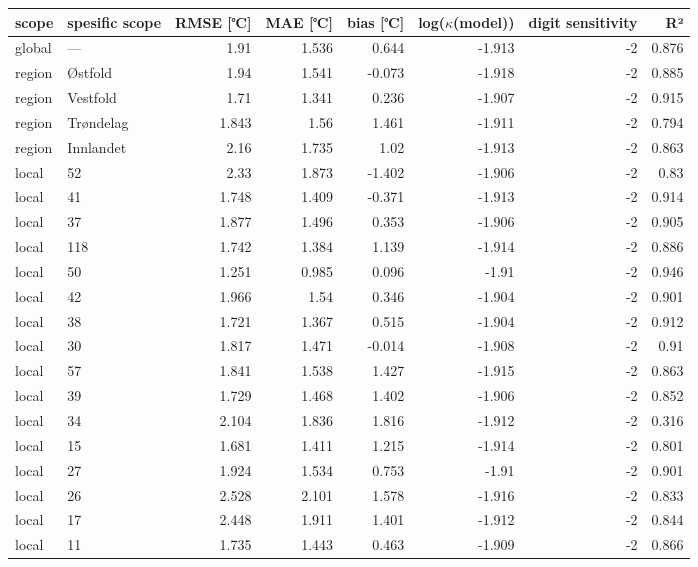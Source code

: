 \begin{tabular}{llrrrrrr}
\hline
 scope   & spesific
scope           &       RMSE
[℃] &   MAE [℃] &        bias
[℃] &   log($\kappa$(model)) &    digit
sensitivity &    R² \\
\hline
 global  & ---       & 1.91  &     1.536 &  0.644 &                 -1.913 & -2 & 0.876 \\
 region  & Østfold   & 1.94  &     1.541 & -0.073 &                 -1.918 & -2 & 0.885 \\
 region  & Vestfold  & 1.71  &     1.341 &  0.236 &                 -1.907 & -2 & 0.915 \\
 region  & Trøndelag & 1.843 &     1.56  &  1.461 &                 -1.911 & -2 & 0.794 \\
 region  & Innlandet & 2.16  &     1.735 &  1.02  &                 -1.913 & -2 & 0.863 \\
 local   & 52        & 2.33  &     1.873 & -1.402 &                 -1.906 & -2 & 0.83  \\
 local   & 41        & 1.748 &     1.409 & -0.371 &                 -1.913 & -2 & 0.914 \\
 local   & 37        & 1.877 &     1.496 &  0.353 &                 -1.906 & -2 & 0.905 \\
 local   & 118       & 1.742 &     1.384 &  1.139 &                 -1.914 & -2 & 0.886 \\
 local   & 50        & 1.251 &     0.985 &  0.096 &                 -1.91  & -2 & 0.946 \\
 local   & 42        & 1.966 &     1.54  &  0.346 &                 -1.904 & -2 & 0.901 \\
 local   & 38        & 1.721 &     1.367 &  0.515 &                 -1.904 & -2 & 0.912 \\
 local   & 30        & 1.817 &     1.471 & -0.014 &                 -1.908 & -2 & 0.91  \\
 local   & 57        & 1.841 &     1.538 &  1.427 &                 -1.915 & -2 & 0.863 \\
 local   & 39        & 1.729 &     1.468 &  1.402 &                 -1.906 & -2 & 0.852 \\
 local   & 34        & 2.104 &     1.836 &  1.816 &                 -1.912 & -2 & 0.316 \\
 local   & 15        & 1.681 &     1.411 &  1.215 &                 -1.914 & -2 & 0.801 \\
 local   & 27        & 1.924 &     1.534 &  0.753 &                 -1.91  & -2 & 0.901 \\
 local   & 26        & 2.528 &     2.101 &  1.578 &                 -1.916 & -2 & 0.833 \\
 local   & 17        & 2.448 &     1.911 &  1.401 &                 -1.912 & -2 & 0.844 \\
 local   & 11        & 1.735 &     1.443 &  0.463 &                 -1.909 & -2 & 0.866 \\
\hline
\end{tabular}